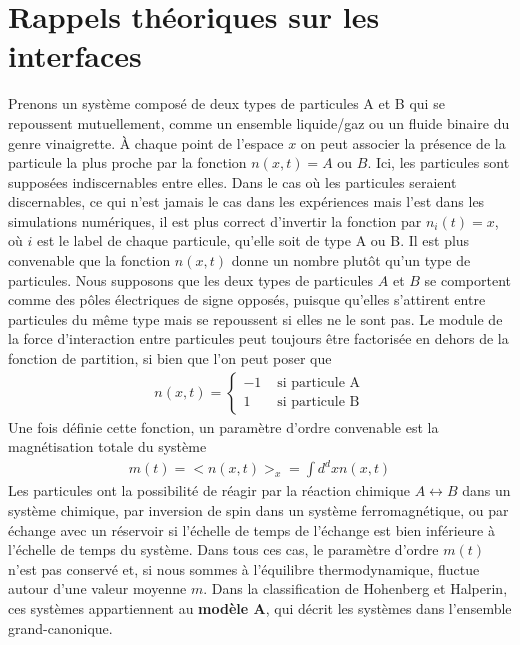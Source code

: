 \chapter{Rappels théoriques sur les interfaces}

Prenons un système composé de deux types de particules A et B qui se repoussent mutuellement, comme un ensemble liquide/gaz ou un fluide binaire du genre vinaigrette. À chaque point de l'espace $x$ on peut associer la présence de la particule la plus proche par la fonction $n(x,t) = A \text{ ou } B$. Ici, les particules sont supposées indiscernables entre elles. Dans le cas où les particules seraient discernables, ce qui n'est jamais le cas dans les expériences mais l'est dans les simulations numériques, il est plus correct d'invertir la fonction par $n_i(t) = x$, où $i$ est le label de chaque particule, qu'elle soit de type A ou B. 
Il est plus convenable que la fonction $n(x,t)$ donne un nombre plutôt qu'un type de particules. Nous supposons que les deux types de particules $A$ et $B$ se comportent comme des pôles électriques de signe opposés, puisque qu'elles s'attirent entre particules du même type mais se repoussent si elles ne le sont pas. Le module de la force d'interaction entre particules peut toujours être factorisée en dehors de la fonction de partition, si bien que l'on peut poser que
\begin{align}
    n(x,t) = \begin{cases} -1 &\text{ si particule A} \\ 1 &\text{ si particule B}  \end{cases}
\end{align}
Une fois définie cette fonction, un paramètre d'ordre convenable est la magnétisation totale du système
\begin{align}
    m(t) = <n(x,t)>_x = \int d^dx  n(x,t)
\end{align}
Les particules ont la possibilité de réagir par la réaction chimique $A \leftrightarrow B$ dans un système chimique, par inversion de spin dans un système ferromagnétique, ou par échange avec un réservoir si l'échelle de temps de l'échange est bien inférieure à l'échelle de temps du système. Dans tous ces cas, le paramètre d'ordre $m(t)$ n'est pas conservé et, si nous sommes à l'équilibre thermodynamique, fluctue autour d'une valeur moyenne $m$.  Dans la classification de Hohenberg et Halperin\cite{hohenberg_theory_1977}, ces systèmes appartiennent au \textbf{modèle A}, qui décrit les systèmes dans l'ensemble grand-canonique.

